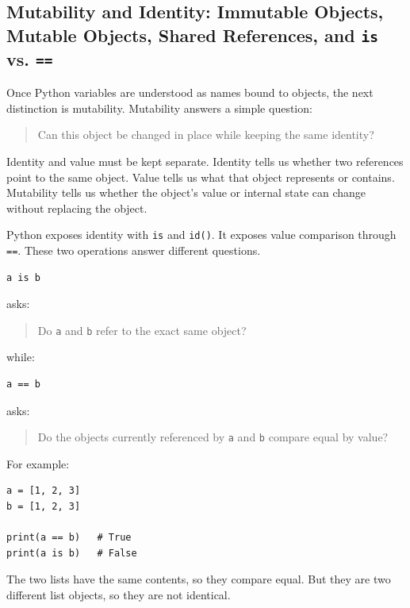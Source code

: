 \subsection{Mutability and Identity: Immutable Objects, Mutable Objects, Shared References, and \texttt{is} vs. \texttt{==}}

Once Python variables are understood as names bound to objects, the next distinction is mutability. Mutability answers a simple question:

\begin{quote}
Can this object be changed in place while keeping the same identity?
\end{quote}

Identity and value must be kept separate. Identity tells us whether two references point to the same object. Value tells us what that object represents or contains. Mutability tells us whether the object's value or internal state can change without replacing the object.

Python exposes identity with \texttt{is} and \texttt{id()}. It exposes value comparison through \texttt{==}. These two operations answer different questions.

\begin{verbatim}
a is b
\end{verbatim}

asks:

\begin{quote}
Do \texttt{a} and \texttt{b} refer to the exact same object?
\end{quote}

while:

\begin{verbatim}
a == b
\end{verbatim}

asks:

\begin{quote}
Do the objects currently referenced by \texttt{a} and \texttt{b} compare equal by value?
\end{quote}

For example:

\begin{verbatim}
a = [1, 2, 3]
b = [1, 2, 3]

print(a == b)   # True
print(a is b)   # False
\end{verbatim}

The two lists have the same contents, so they compare equal. But they are two different list objects, so they are not identical.

